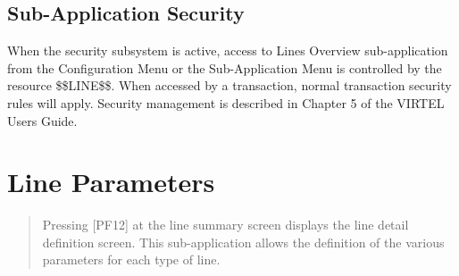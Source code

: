 \documentclass[letterpaper,10pt,english]{sphinxmanual}
\begin{document}


\subsection{Sub-Application Security}
\label{\detokenize{connectivity_guide:id1}}
When the security subsystem is active, access to Lines Overview sub-application from the Configuration Menu or the Sub-Application Menu is controlled by the resource \$\$LINE\$\$. When accessed by a transaction, normal transaction security rules will apply. Security management is described in Chapter 5 of the VIRTEL Users Guide.


\section{Line Parameters}
\label{\detokenize{connectivity_guide:line-parameters}}\begin{quote}

Pressing {[}PF12{]} at the line summary screen displays the line detail definition screen. This sub-application allows the definition of the various parameters for each type of line.
\end{quote}

\end{document}
